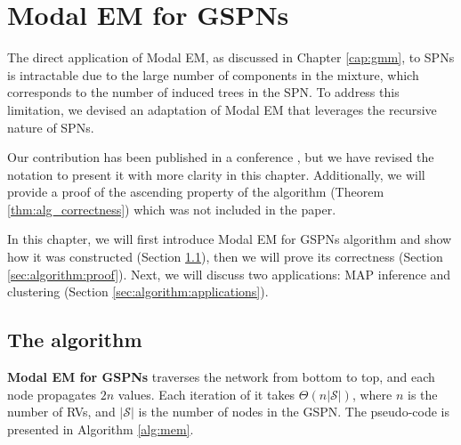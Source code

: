 \chapter{Modal EM for GSPNs}
\label{cap:algorithm}

The direct application of Modal EM, as discussed in Chapter \ref{cap:gmm}, to SPNs is intractable due to the large number of components in the mixture, which corresponds to the number of induced trees in the SPN. To address this limitation, we devised an adaptation of Modal EM that leverages the recursive nature of SPNs.

Our contribution has been published in a conference \citep{Madeira2022}, but we have revised the notation to present it with more clarity in this chapter. Additionally, we will provide a proof of the ascending property of the algorithm (Theorem \ref{thm:alg_correctness}) which was not included in the paper.

In this chapter, we will first introduce Modal EM for GSPNs algorithm and show how it was constructed (Section \ref{sec:algorithm:intro}), then we will prove its correctness (Section \ref{sec:algorithm:proof}). Next, we will discuss two applications: MAP inference and clustering (Section \ref{sec:algorithm:applications}).

\section{The algorithm}
\label{sec:algorithm:intro}

\textbf{Modal EM for GSPNs} traverses the network from bottom to top, and each node propagates $2n$ values. Each iteration of it takes $\Theta\left(n|\mathcal{S}|\right)$, where $n$ is the number of RVs, and $|\mathcal{S}|$ is the number of nodes in the GSPN. The pseudo-code is presented in Algorithm \ref{alg:mem}.

